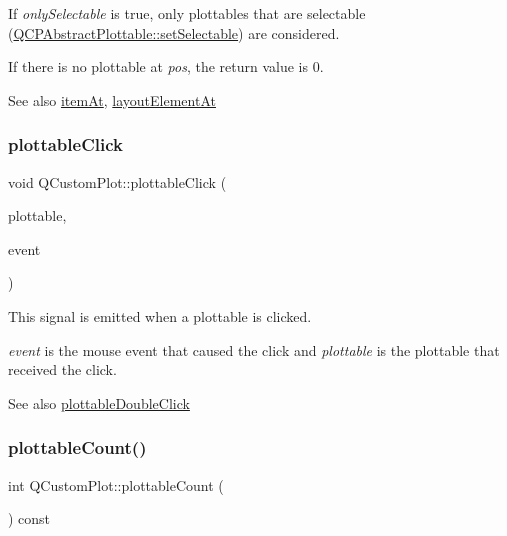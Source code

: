 If {\itshape only\+Selectable} is true, only plottables that are selectable (\mbox{\hyperlink{class_q_c_p_abstract_plottable_a22c69299eb5569e0f6bf084877a37dc4}{Q\+C\+P\+Abstract\+Plottable\+::set\+Selectable}}) are considered.

If there is no plottable at {\itshape pos}, the return value is 0.

\begin{DoxySeeAlso}{See also}
\mbox{\hyperlink{class_q_custom_plot_ac08578e0e6c059c83a8d340ba0038e8e}{item\+At}}, \mbox{\hyperlink{class_q_custom_plot_afaa1d304e0287d140fd238e90889ef3c}{layout\+Element\+At}} 
\end{DoxySeeAlso}
\mbox{\label{class_q_custom_plot_a57e5efa8a854620e9bf62d31fc139f53}} 
\subsubsection{\texorpdfstring{plottable\+Click}{plottableClick}}
{\footnotesize\ttfamily void Q\+Custom\+Plot\+::plottable\+Click (\begin{DoxyParamCaption}\item[{\mbox{\hyperlink{class_q_c_p_abstract_plottable}{Q\+C\+P\+Abstract\+Plottable}} $\ast$}]{plottable,  }\item[{Q\+Mouse\+Event $\ast$}]{event }\end{DoxyParamCaption})\hspace{0.3cm}{\ttfamily [signal]}}

This signal is emitted when a plottable is clicked.

{\itshape event} is the mouse event that caused the click and {\itshape plottable} is the plottable that received the click.

\begin{DoxySeeAlso}{See also}
\mbox{\hyperlink{class_q_custom_plot_af2e6f1cea923dae437681d01ce7d0c31}{plottable\+Double\+Click}} 
\end{DoxySeeAlso}
\mbox{\label{class_q_custom_plot_a5f4f15991c14bf9ad659bb2a19dfbed4}} 
\subsubsection{\texorpdfstring{plottable\+Count()}{plottableCount()}}
{\footnotesize\ttfamily int Q\+Custom\+Plot\+::plottable\+Count (\begin{DoxyParamCaption}{ }\end{DoxyParamCaption}) const}

